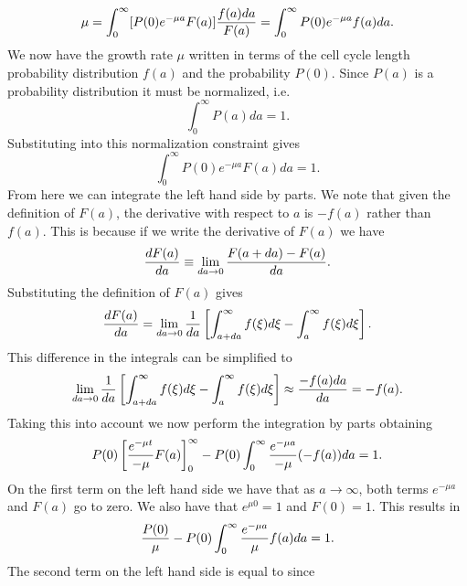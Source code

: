 \begin{equation}
  \mu = \int_0^\infty [P(0) e^{-\mu a} F(a)] {f(a)da \over F(a)}
  = \int_0^\infty P(0) e^{-\mu a} f(a)da.
  \label{seq_mu_integral}
\end{equation}
We now have the growth rate $\mu$ written in terms of the cell cycle length
probability distribution $f(a)$ and the probability $P(0)$. Since $P(a)$ is a
probability distribution it must be normalized, i.e.
\begin{equation}
  \int_0^\infty P(a) da = 1.
\end{equation}
Substituting  into this normalization constraint gives
\begin{equation}
  \int_0^\infty P(0) e^{-\mu a} F(a) da = 1.
\end{equation}
From here we can integrate the left hand side by parts. We note that given the
definition of $F(a)$, the derivative with respect to $a$ is $-f(a)$ rather than
$f(a)$. This is because if we write the derivative of $F(a)$ we have
\begin{equation}
  {dF(a) \over da} \equiv \lim_{da \rightarrow 0}
  {F(a + da) - F(a) \over da}.
\end{equation}
Substituting the definition of $F(a)$ gives
\begin{equation}
  {dF(a) \over  da} = \lim_{da \rightarrow 0} {1 \over da}
  \left[\int_{a + da}^\infty f(\xi) d\xi - \int_a^\infty f(\xi) d\xi \right].
\end{equation}
This difference in the integrals can be simplified to
\begin{equation}
  \lim_{da \rightarrow 0} {1 \over da} \left[ \int_{a + da}^\infty f(\xi) d\xi -
  \int_a^\infty f(\xi) d\xi \right]\approx {-f(a)da \over da} = -f(a).
\end{equation}
Taking this into account we now perform the integration by parts obtaining
\begin{equation}
 P(0) \left[ {e^{-\mu t} \over -\mu} F(a) \right]^\infty_0
 - P(0) \int_0^\infty {e^{-\mu a} \over -\mu} (-f(a)) da = 1.
 \label{seq_inte_byparts}
\end{equation}
On the first term on the left hand side we have that as $a \rightarrow \infty$,
both terms $e^{-\mu a}$ and $F(a)$ go to zero. We also have that $e^{\mu 0} = 1$
and $F(0) = 1$. This results in
\begin{equation}
  {P(0) \over \mu} - P(0) \int_0^\infty {e^{-\mu a} \over \mu} f(a) da = 1.
\end{equation}
The second term on the left hand side is equal to  since
